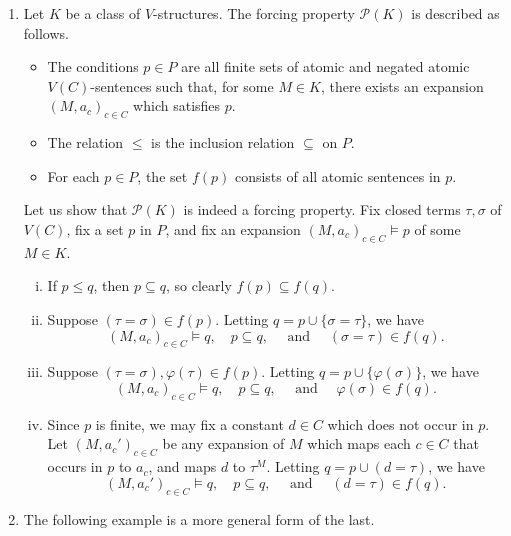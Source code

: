 \documentclass{scrartcl}
\renewcommand{\phi}{\varphi}
\newcommand{\SP}{\mathscr{P}}
\begin{document}
\begin{examples}
\begin{enumerate}
\label{E:forcing properties}

\item Let $K$ be a class of $V$-structures. The forcing property $\SP(K)$ is described as follows.
 
\begin{itemize}
\item
The conditions $p\in P$ are all finite sets of atomic and negated atomic $V(C)$-sentences such that, for some $M\in K$, there exists an expansion $(M,a_c)_{c\in C}$ which satisfies $p$.
\item
The relation $\le$ is the inclusion relation $\subseteq$ on $P$.
\item
For each $p\in P$, the set $f(p)$ consists of all atomic sentences in $p$.
\end{itemize}


Let us show that $\SP(K)$ is indeed a forcing property. Fix closed terms $\tau, \sigma$ of $V(C)$, fix a set $p$ in $P$, and fix an expansion $(M,a_c)_{c\in C}\models p$ of some $M\in K$.


\begin{enumerate}[i)]

\item
If $p\le q$, then $p\subseteq q$, so clearly $f(p)\subseteq f(q)$.

\item
Suppose $(\tau = \sigma) \in f(p)$. Letting $q = p\cup \{\sigma = \tau\}$, we have
\[
(M, a_c)_{c\in C}\models q,\quad p\subseteq q,\quad \text{ and } \quad(\sigma = \tau)\in f(q).
\]

\item
Suppose $(\tau = \sigma),\phi(\tau) \in f(p)$. Letting $q = p\cup \{\phi(\sigma)\}$, we have
\[
(M, a_c)_{c\in C}\models q,\quad p\subseteq q,\quad \text{ and } \quad \phi(\sigma)\in f(q).
\]

\item
Since $p$ is finite, we may fix a constant $d\in C$ which does not occur in $p$. Let $(M, {a_c}')_{c\in C}$ be any expansion of $M$ which maps each $c\in C$ that occurs in $p$ to $a_c$, and maps $d$ to $\tau^M$. Letting $q = p\cup (d = \tau)$, we have
\[
(M, {a_c}')_{c\in C}\models q,\quad p\subseteq q,\quad \text{ and } \quad(d = \tau)\in f(q).
\]


\end{enumerate}


\item
The following example is a more general form of the last.


\end{enumerate}
\end{examples}
\end{document}
